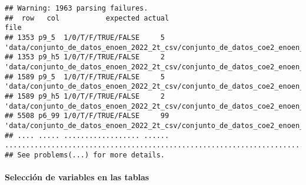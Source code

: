 \documentclass[
]{article}
\newenvironment{Shaded}{\begin{snugshade}}{\end{snugshade}}
\newcommand{\AttributeTok}[1]{\textcolor[rgb]{0.77,0.63,0.00}{#1}}
\newcommand{\FunctionTok}[1]{\textcolor[rgb]{0.00,0.00,0.00}{#1}}
\newcommand{\NormalTok}[1]{#1}
\newcommand{\OtherTok}[1]{\textcolor[rgb]{0.56,0.35,0.01}{#1}}
\newcommand{\SpecialCharTok}[1]{\textcolor[rgb]{0.00,0.00,0.00}{#1}}
\newcommand{\StringTok}[1]{\textcolor[rgb]{0.31,0.60,0.02}{#1}}
\begin{document}
\begin{verbatim}
## Warning: 1963 parsing failures.
##  row   col           expected actual                                                                                                                                       file
## 1353 p9_5  1/0/T/F/TRUE/FALSE     5  'data/conjunto_de_datos_enoen_2022_2t_csv/conjunto_de_datos_coe2_enoen_2022_2t/conjunto_de_datos/conjunto_de_datos_coe2_enoen_2022_2t.csv'
## 1353 p9_h5 1/0/T/F/TRUE/FALSE     2  'data/conjunto_de_datos_enoen_2022_2t_csv/conjunto_de_datos_coe2_enoen_2022_2t/conjunto_de_datos/conjunto_de_datos_coe2_enoen_2022_2t.csv'
## 1589 p9_5  1/0/T/F/TRUE/FALSE     5  'data/conjunto_de_datos_enoen_2022_2t_csv/conjunto_de_datos_coe2_enoen_2022_2t/conjunto_de_datos/conjunto_de_datos_coe2_enoen_2022_2t.csv'
## 1589 p9_h5 1/0/T/F/TRUE/FALSE     2  'data/conjunto_de_datos_enoen_2022_2t_csv/conjunto_de_datos_coe2_enoen_2022_2t/conjunto_de_datos/conjunto_de_datos_coe2_enoen_2022_2t.csv'
## 5508 p6_99 1/0/T/F/TRUE/FALSE     99 'data/conjunto_de_datos_enoen_2022_2t_csv/conjunto_de_datos_coe2_enoen_2022_2t/conjunto_de_datos/conjunto_de_datos_coe2_enoen_2022_2t.csv'
## .... ..... .................. ...... ..........................................................................................................................................
## See problems(...) for more details.
\end{verbatim}

\hypertarget{selecciuxf3n-de-variables-en-las-tablas}{%
\paragraph{Selección de variables en las
tablas}\label{selecciuxf3n-de-variables-en-las-tablas}}

\begin{Shaded}
\end{Shaded}
\end{document}
